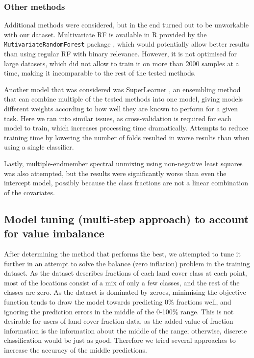 \documentclass[review,authoryear,3p]{elsarticle}
\begin{document}
\subsubsection{Other methods}

Additional methods were considered, but in the end turned out to be unworkable with our dataset.
Multivariate \gls{RF} is available in R provided by the \texttt{MutivariateRandomForest} package \citep{MultivariateRandomForest}, which would potentially allow better results than using regular \gls{RF} with binary relevance.
However, it is not optimised for large datasets, which did not allow to train it on more than 2000 samples at a time, making it incomparable to the rest of the tested methods.

Another model that was considered was SuperLearner \citep{SuperLearner}, an ensembling method that can combine multiple of the tested methods into one model, giving models different weights according to how well they are known to perform for a given task.
Here we ran into similar issues, as cross-validation is required for each model to train, which increases processing time dramatically.
Attempts to reduce training time by lowering the number of folds resulted in worse results than when using a single classifier.

Lastly, multiple-endmember spectral unmixing using non-negative least squares \citep{franc2005sequential} was also attempted, but the results were significantly worse than even the intercept model, possibly because the class fractions are not a linear combination of the covariates.

\subsection{Model tuning (multi-step approach) to account for value imbalance}
\label{sec-multistep}

After determining the method that performs the best, we attempted to tune it further in an attempt to solve the balance (zero inflation) problem in the training dataset.
As the dataset describes fractions of each land cover class at each point, most of the locations consist of a mix of only a few classes, and the rest of the classes are zero.
As the dataset is dominated by zeroes, minimising the objective function tends to draw the model towards predicting 0\% fractions well, and ignoring the prediction errors in the middle of the 0-100\% range.
This is not desirable for users of land cover fraction data, as the added value of fraction information is the information about the middle of the range; otherwise, discrete classification would be just as good.
Therefore we tried several approaches to increase the accuracy of the middle predictions.
\end{document}
